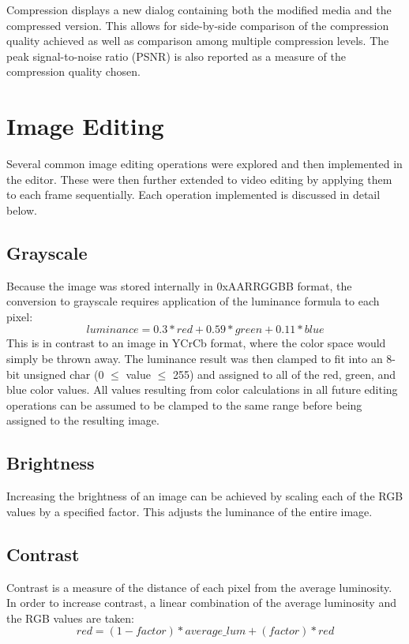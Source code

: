 \documentclass[10pt,twocolumn,twoside]{IEEEtran}
\begin{document}
Compression displays a new dialog containing both the modified media and the compressed version. This allows for side-by-side comparison of the compression quality achieved as well as comparison among multiple compression levels. The peak signal-to-noise ratio (PSNR) is also reported as a measure of the compression quality chosen.

\section{Image Editing}
Several common image editing operations were explored and then implemented in the editor. These were then further extended to video editing by applying them to each frame sequentially. Each operation implemented is discussed in detail below.

\subsection{Grayscale}
Because the image was stored internally in 0xAARRGGBB format, the conversion to grayscale requires application of the luminance formula to each pixel: \begin{equation*}luminance = 0.3*red + 0.59*green + 0.11*blue \end{equation*}
This is in contrast to an image in YCrCb format, where the color space would simply be thrown away. The luminance result was then clamped to fit into an 8-bit unsigned char (0 $\leq$ value $\leq$ 255) and assigned to all of the red, green, and blue color values. All values resulting from color calculations in all future editing operations can be assumed to be clamped to the same range before being assigned to the resulting image. 

\subsection{Brightness}
Increasing the brightness of an image can be achieved by scaling each of the RGB values by a specified factor. This adjusts the luminance of the entire image.

\subsection{Contrast}
Contrast is a measure of the distance of each pixel from the average luminosity. In order to increase contrast, a linear combination of the average luminosity and the RGB values are taken:
\begin{equation*} red = (1 - factor)*average\_lum + (factor)*red \end{equation*}
\end{document}
